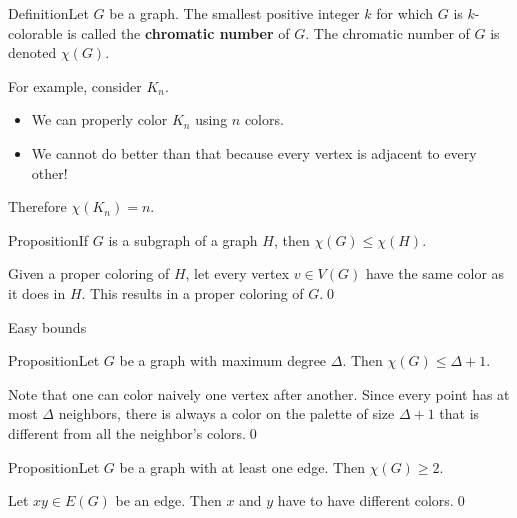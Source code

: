 \documentclass{beamer}
\def\bl[#1]#2{\begin{block}{#1}#2\end{block}}
\def\itemb{\begin{itemize}}
\def\iteme{\end{itemize}}
\begin{document}
\begin{frame}
\bl[Definition]{Let $G$ be a graph. The smallest positive integer $k$ for which $G$ is $k$-colorable is called the \textbf{chromatic number} of $G$. The chromatic number of $G$ is denoted $\chi(G)$.}
For example, consider $K_n$.
\itemb
\item We can properly color $K_n$ using $n$ colors.
\item We cannot do better than that because every vertex is adjacent to every other!
\iteme
Therefore $\chi(K_n)=n$.
\bl[Proposition]{If $G$ is a subgraph of a graph $H$, then $\chi(G)\leq\chi(H)$.}
Given a proper coloring of $H$, let every vertex $v\in V(G)$ have the same color as it does in $H$. This results in a proper coloring of $G$.\qed
\end{frame}

\begin{frame}{Easy bounds}
\bl[Proposition]{Let $G$ be a graph with maximum degree $\Delta$. Then $\chi(G)\leq \Delta+1$.}
Note that one can color naively one vertex after another. Since every point has at most $\Delta$ neighbors, there is always a color on the palette of size $\Delta+1$ that is different from all the neighbor's colors.\qed
\bl[Proposition]{Let $G$ be a graph with at least one edge. Then $\chi(G)\geq 2$.}
Let $xy\in E(G)$ be an edge. Then $x$ and $y$ have to have different colors.\qed
\end{frame}
\end{document}

